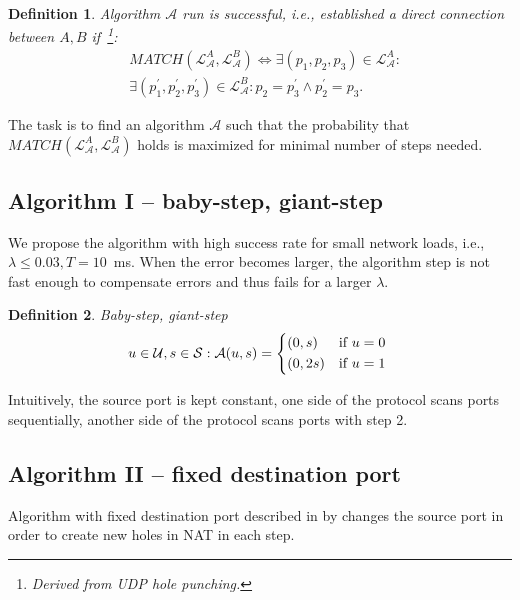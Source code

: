\documentclass{acm_proc_article-sp}
\newtheorem{mydef}{Definition}
\begin{document}
\begin{mydef}
\label{def:match}
Algorithm $\mathcal{A}$ run is successful, i.e., established a direct connection between $A,B$ if~\footnote{Derived from UDP hole punching.}:
\begin{align*}
& MATCH(\mathcal{L}^{A}_{\mathcal{A}}, \mathcal{L}^{B}_{\mathcal{A}}) \Leftrightarrow \exists(p_1, p_2, p_3) \in \mathcal{L}^{A}_{\mathcal{A}}: \\
& \exists(p_1^{\prime}, p_2^{\prime}, p_3^{\prime}) \in \mathcal{L}^{B}_{\mathcal{A}}: p_2 = p_3^{\prime} \wedge p_2^{\prime} = p_3.
%
\end{align*}
\end{mydef}
The task is to find an algorithm $\mathcal{A}$ such that the probability that $MATCH(\mathcal{L}^{A}_{\mathcal{A}}, \mathcal{L}^{B}_{\mathcal{A}})$
holds is maximized for minimal number of steps needed.

\subsection{Algorithm I -- baby-step, giant-step}
We propose the algorithm with high success rate for small network loads, i.e.,
$\lambda \leq 0.03, T=10$~ms. When the error becomes larger, the
algorithm step is not fast enough to compensate errors and thus fails for a larger $\lambda$.

\begin{mydef}
Baby-step, giant-step
\[
u \in \mathcal{U}, s \in \mathcal{S}: 
\mathcal{A}(u, s) = \begin{dcases*}
         (0, s)  & \text{if} $u=0$\\
         (0, 2s) & \text{if} $u=1$
        \end{dcases*}
\]
\end{mydef}

Intuitively, the source port is kept constant, one side of the protocol scans ports sequentially, another
side of the protocol scans ports with step 2.

\subsection{Algorithm II -- fixed destination port}
Algorithm with fixed destination port described in by \citep{Wang:2006:RSN:1156422.1156550}
changes the source port in order to create new holes in NAT in each step.
\end{document}
